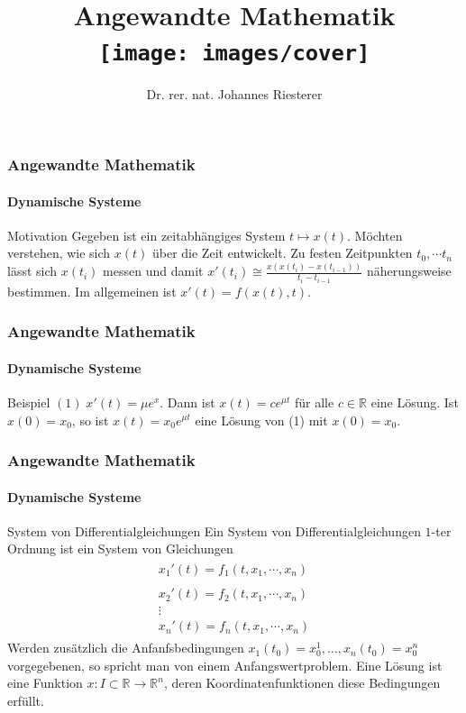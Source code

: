 \documentclass{beamer}
\begin{document}
\title[Angewandte Mathematik] %
{Angewandte Mathematik
\\
\texttt{[image: images/cover]}
}
\subtitle{}
\author[Dr. Johannes Riesterer] %
{Dr.  rer. nat. Johannes Riesterer}

\date[KPT 2004] %
{}

\subject{Angewandte Mathematik}



\frame{\titlepage}



\begin{frame}
    \frametitle{Angewandte Mathematik}
\framesubtitle{Dynamische Systeme }
\begin{block}{Motivation}
Gegeben ist ein zeitabhängiges System $t \mapsto x(t)$. Möchten verstehen, wie sich $x(t)$ über die Zeit entwickelt. Zu festen Zeitpunkten $t_0, \cdots t_n $ lässt sich $x(t_i)$ messen und damit $x'(t_i) \cong \frac{x(x(t_i) - x(t_{i-1}))}{t_i - t_{i-1}}$ näherungsweise bestimmen. Im allgemeinen ist $x'(t) = f(x(t), t)$. 
\end{block}
 \end{frame}

\begin{frame}
    \frametitle{Angewandte Mathematik}
\framesubtitle{Dynamische Systeme }
\begin{block}{Beispiel}
$(1) \;x'(t) = \mu e^{x}$.  Dann ist $x(t)= c e^{\mu t}$ für alle $c \in \mathbb{R}$ eine Lösung. Ist $x(0) = x_0$, so ist   $x(t)= x_0 e^{\mu t}$ eine Lösung von (1) mit $x(0) = x_0$. 
\end{block}
 \end{frame}

\begin{frame}
    \frametitle{Angewandte Mathematik}
\framesubtitle{Dynamische Systeme }
\begin{block}{System von Differentialgleichungen}
Ein System von Differentialgleichungen $1$-ter Ordnung ist ein System von Gleichungen
\begin{align*}
\begin{matrix} x_1'(t) = f_1(t, x_1, \cdots, x_n ) \\  \\ x_2'(t) = f_2(t, x_1, \cdots, x_n ) \\  \vdots \\  x_n'(t) = f_n(t, x_1, \cdots, x_n )\end{matrix}
\end{align*}
Werden zusätzlich die Anfanfsbedingungen $x_1(t_0)= x_0^1, \dots ,  x_n(t_0) = x_0^n$ vorgegebenen, so spricht man von einem Anfangswertproblem.
Eine Lösung ist eine Funktion $x : I \subset \mathbb{R} \to \mathbb{R}^n$, deren Koordinatenfunktionen diese Bedingungen erfüllt.
\end{block}
 \end{frame}
\end{document}
